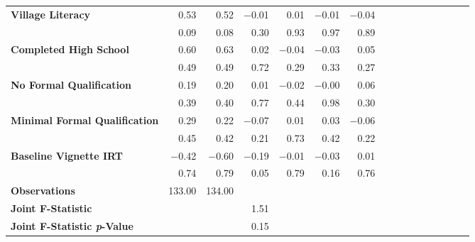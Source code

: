 \begin{tabular}{@{\extracolsep{5pt}}lrrrrrrrrrrrrrrr}
{\bf Village Literacy} & 0.53\phantom{***} & 0.52\phantom{***} & $-$0.01\phantom{***} & 0.01\phantom{***} & $-$0.01\phantom{***} & $-$0.04\phantom{***} \\
{\bf } & 0.09\phantom{***} & 0.08\phantom{***} & 0.30\phantom{***} & 0.93\phantom{***} & 0.97\phantom{***} & 0.89\phantom{***} \\
{\bf Completed High School} & 0.60\phantom{***} & 0.63\phantom{***} & 0.02\phantom{***} & $-$0.04\phantom{***} & $-$0.03\phantom{***} & 0.05\phantom{***} \\
{\bf } & 0.49\phantom{***} & 0.49\phantom{***} & 0.72\phantom{***} & 0.29\phantom{***} & 0.33\phantom{***} & 0.27\phantom{***} \\
{\bf No Formal Qualification} & 0.19\phantom{***} & 0.20\phantom{***} & 0.01\phantom{***} & $-$0.02\phantom{***} & $-$0.00\phantom{***} & 0.06\phantom{***} \\
{\bf } & 0.39\phantom{***} & 0.40\phantom{***} & 0.77\phantom{***} & 0.44\phantom{***} & 0.98\phantom{***} & 0.30\phantom{***} \\
{\bf Minimal Formal Qualification} & 0.29\phantom{***} & 0.22\phantom{***} & $-$0.07\phantom{***} & 0.01\phantom{***} & 0.03\phantom{***} & $-$0.06\phantom{***} \\
{\bf } & 0.45\phantom{***} & 0.42\phantom{***} & 0.21\phantom{***} & 0.73\phantom{***} & 0.42\phantom{***} & 0.22\phantom{***} \\
{\bf Baseline Vignette IRT} & $-$0.42\phantom{***} & $-$0.60\phantom{***} & $-$0.19\phantom{***} & $-$0.01\phantom{***} & $-$0.03\phantom{***} & 0.01\phantom{***} \\
{\bf } & 0.74\phantom{***} & 0.79\phantom{***} & 0.05\phantom{***} & 0.79\phantom{***} & 0.16\phantom{***} & 0.76\phantom{***} \\
{\bf Observations} & 133.00\phantom{***} & 134.00\phantom{***} & \phantom{***} & \phantom{***} & \phantom{***} & \phantom{***} \\
{\bf Joint F-Statistic} & \phantom{***} & \phantom{***} & 1.51\phantom{***} & \phantom{***} & \phantom{***} & \phantom{***} \\
{\bf Joint F-Statistic \textit{p}-Value} & \phantom{***} & \phantom{***} & 0.15\phantom{***} & \phantom{***} & \phantom{***} & \phantom{***} \\
\hline
\end{tabular}

